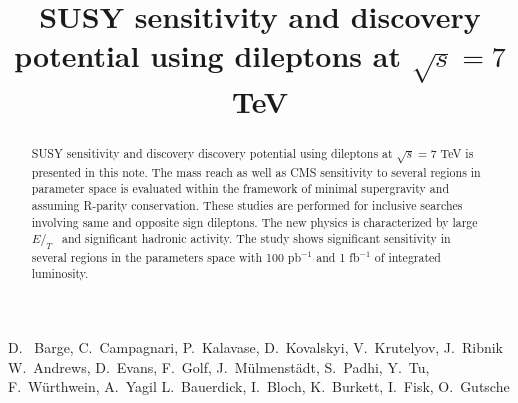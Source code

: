 \documentclass{cmspaper}
\newcommand{\met} {\ensuremath{E\!\!\!\!/_T}}
\begin{document}
%
\begin{titlepage}
\title{SUSY sensitivity and discovery potential using dileptons at $\sqrt{s} = 7 $ TeV}

  \begin{Authlist}
    D.~ Barge, C.~Campagnari, P.~Kalavase, D.~Kovalskyi, V.~Krutelyov, J.~Ribnik
    W.~Andrews, D.~Evans, F.~Golf, J.~M\"ulmenst\"adt, S.~Padhi, Y.~Tu, F.~W\"urthwein, A.~Yagil
    L.~Bauerdick, I.~Bloch, K.~Burkett, I.~Fisk, O.~Gutsche
  \end{Authlist}

\begin{abstract}
SUSY sensitivity and discovery discovery potential using dileptons at $\sqrt{s} = 7 $ TeV
is presented in this note. The mass reach as well as CMS sensitivity to several regions in
parameter space is evaluated within the framework of minimal supergravity and assuming R-parity
conservation. These studies are performed for inclusive searches involving same and opposite 
sign dileptons. The new physics is characterized by large \met~ and significant hadronic 
activity. The study shows significant sensitivity in several regions in the parameters 
space with 100 pb$^{-1}$ and 1 fb$^{-1}$ of integrated luminosity.
\end{abstract}
\end{titlepage}









\clearpage

\end{document}
